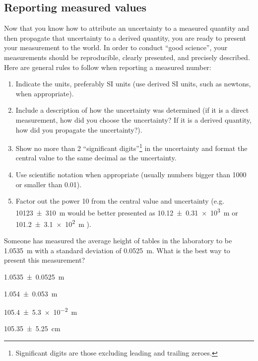 \subsection{Reporting measured values}
Now that you know how to attribute an uncertainty to a measured quantity and then propagate that uncertainty to a derived quantity, you are ready to present your measurement to the world. In order to conduct ``good science'', your measurements should be reproducible, clearly presented, and precisely described. Here are general rules to follow when reporting a measured number:
\begin{enumerate}
\item Indicate the units, preferably SI units (use derived SI units, such as newtons, when appropriate).
\item Include a description of how the uncertainty was determined (if it is a direct measurement, how did you choose the uncertainty? If it is a derived quantity, how did you propagate the uncertainty?).
\item Show no more than 2 ``significant digits''\footnote{Significant digits are those excluding leading and trailing zeroes.} in the uncertainty and format the central value to the same decimal as the uncertainty. 
\item Use scientific notation when appropriate (usually numbers bigger than 1000 or smaller than 0.01).
\item Factor out the power 10 from the central value and uncertainty (e.g. \SI{10123\pm 310}{m} would be better presented as \SI{10.12\pm 0.31e3}{m} or \SI{101.2\pm 3.1e2}{m} ).
\end{enumerate}

\begin{checkpoint}
\begin{MCquestion}{Someone has measured the average height of tables in the laboratory to be \SI{1.0535}{m} with a standard deviation of \SI{0.0525}{m}. What is the best way to present this measurement?}
\item \SI{1.0535\pm 0.0525}{m}
\item \SI{1.054\pm 0.053}{m}
\item \SI{105.4\pm 5.3e-2}{m} \correct
\item \SI{105.35\pm 5.25}{cm}
\end{MCquestion}
\end{checkpoint}

